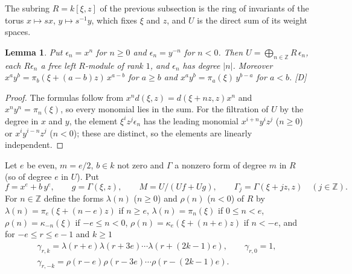 \documentclass[11pt]{article}
\newtheorem{lemma}{Lemma}
\theoremstyle{definition}
\theoremstyle{remark}
\begin{document}
The subring $R=k[\xi,z]$ of the previous subsection is the ring of invariants of the torus $x\mapsto sx$, $y\mapsto s^{-1}y$, which fixes $\xi$ and $z$, and $U$ is the direct sum of its weight spaces.

\begin{lemma}\label{lem:xi}
Put $\epsilon_n=x^n$ for $n\ge0$ and $\epsilon_n=y^{-n}$ for $n<0$. Then $U=\bigoplus_{n\in\mathbb Z}R\,\epsilon_n$, each $R\epsilon_n$ a free left $R$-module of rank $1$, and $\epsilon_n$ has degree $|n|$. Moreover $x^ay^b=\pi_b(\xi+(a-b)z)\,x^{a-b}$ for $a\ge b$ and $x^ay^b=\pi_a(\xi)\,y^{b-a}$ for $a<b$. [D]
\end{lemma}
\begin{proof}
The formulas follow from $x^nd(\xi,z)=d(\xi+nz,z)x^n$ and $x^ny^n=\pi_n(\xi)$, so every monomial lies in the sum. For the filtration of $U$ by the degree in $x$ and $y$, the element $\xi^iz^j\epsilon_n$ has the leading monomial $x^{i+n}y^iz^j$ ($n\ge0$) or $x^iy^{i-n}z^j$ ($n<0$); these are distinct, so the elements are linearly independent.
\end{proof}

Let $e$ be even, $m=e/2$, $b\in k$ not zero and $\Gamma$ a nonzero form of degree $m$ in $R$ (so of degree $e$ in $U$). Put
\[
f=x^e+b\,y^e,\qquad g=\Gamma(\xi,z),\qquad M=U/(Uf+Ug),\qquad \Gamma_j=\Gamma(\xi+jz,z)\quad(j\in\mathbb Z).
\]
For $n\in\mathbb Z$ define the forms $\lambda(n)$ ($n\ge0$) and $\rho(n)$ ($n<0$) of $R$ by $\lambda(n)=\pi_e(\xi+(n-e)z)$ if $n\ge e$, $\lambda(n)=\pi_n(\xi)$ if $0\le n<e$, $\rho(n)=\kappa_{-n}(\xi)$ if $-e\le n<0$, $\rho(n)=\kappa_e(\xi+(n+e)z)$ if $n<-e$, and for $-e\le r\le e-1$ and $k\ge1$
\begin{gather*}
\gamma_{r,k}=\lambda(r+e)\lambda(r+3e)\cdots\lambda(r+(2k-1)e),\qquad\gamma_{r,0}=1,\\
\gamma_{r,-k}=\rho(r-e)\rho(r-3e)\cdots\rho(r-(2k-1)e).
\end{gather*}
\end{document}
